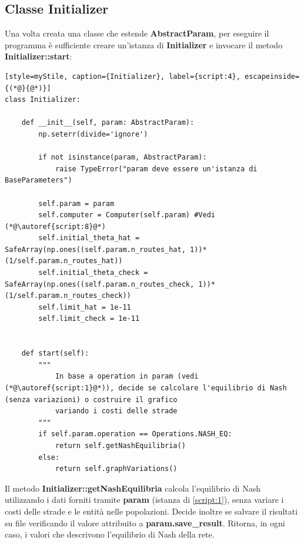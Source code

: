 \subsection{Classe Initializer}
\label{subsec:Initializer}

Una volta creata una classe che estende \textbf{AbstractParam}, per eseguire il programma è sufficiente creare un'istanza di \textbf{Initializer} e invocare il metodo 
\textbf{Initializer::start}:

\begin{lstlisting}[style=myStile, caption={Initializer}, label={script:4}, escapeinside={(*@}{@*)}]
class Initializer:
    
    def __init__(self, param: AbstractParam):
        np.seterr(divide='ignore')
        
        if not isinstance(param, AbstractParam):
            raise TypeError("param deve essere un'istanza di BaseParameters")
        
        self.param = param
        self.computer = Computer(self.param) #Vedi (*@\autoref{script:8}@*)
        self.initial_theta_hat = SafeArray(np.ones((self.param.n_routes_hat, 1))*(1/self.param.n_routes_hat))
        self.initial_theta_check = SafeArray(np.ones((self.param.n_routes_check, 1))*(1/self.param.n_routes_check))
        self.limit_hat = 1e-11
        self.limit_check = 1e-11
        
        
    def start(self):
        """
            In base a operation in param (vedi (*@\autoref{script:1}@*)), decide se calcolare l'equilibrio di Nash (senza variazioni) o costruire il grafico
            variando i costi delle strade
        """
        if self.param.operation == Operations.NASH_EQ:
            return self.getNashEquilibria()
        else:
            return self.graphVariations()
\end{lstlisting}

Il metodo \textbf{Initializer::getNashEquilibria} calcola l'equilibrio di Nash utilizzando i dati forniti tramite \textbf{param} (istanza di \autoref{script:1}), senza variare
i costi delle strade e le entità nelle popolazioni. Decide inoltre se salvare il risultati su file verificando il valore attribuito a \textbf{param.save\_result}. Ritorna, in ogni
caso, i valori che descrivono l'equilibrio di Nash della rete.

